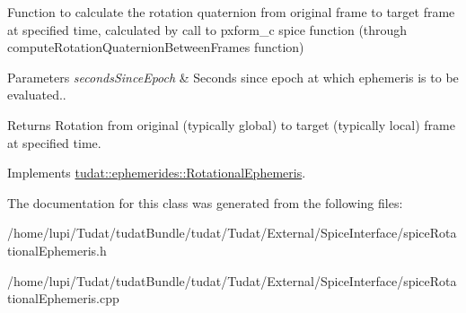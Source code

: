 Function to calculate the rotation quaternion from original frame to target frame at specified time, calculated by call to pxform\+\_\+c spice function (through compute\+Rotation\+Quaternion\+Between\+Frames function) 
\begin{DoxyParams}{Parameters}
{\em seconds\+Since\+Epoch} & Seconds since epoch at which ephemeris is to be evaluated.. \\
\hline
\end{DoxyParams}
\begin{DoxyReturn}{Returns}
Rotation from original (typically global) to target (typically local) frame at specified time. 
\end{DoxyReturn}


Implements \hyperlink{classtudat_1_1ephemerides_1_1RotationalEphemeris_a569eeb2b7416693589b6f2b4707932a7}{tudat\+::ephemerides\+::\+Rotational\+Ephemeris}.



The documentation for this class was generated from the following files\+:\begin{DoxyCompactItemize}
\item 
/home/lupi/\+Tudat/tudat\+Bundle/tudat/\+Tudat/\+External/\+Spice\+Interface/spice\+Rotational\+Ephemeris.\+h\item 
/home/lupi/\+Tudat/tudat\+Bundle/tudat/\+Tudat/\+External/\+Spice\+Interface/spice\+Rotational\+Ephemeris.\+cpp\end{DoxyCompactItemize}
